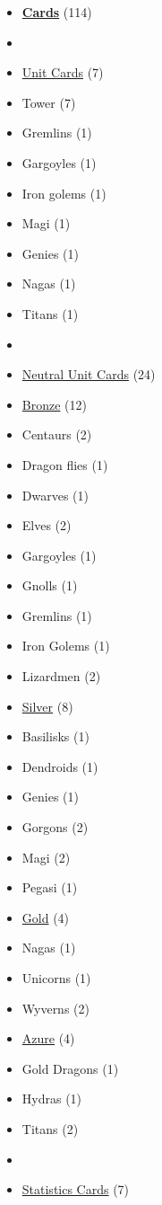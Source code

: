 \begin{multicols}{3}
\begin{itemize}[leftmargin=0pt, label={}, noitemsep, noitemsep]
  \item \textbf{\underline{Cards}} (114)
  \item
  \item \underline{Unit Cards} (7)
  \item Tower (7)
  \item Gremlins (1)
  \item Gargoyles (1)
  \item Iron golems (1)
  \item Magi (1)
  \item Genies (1)
  \item Nagas (1)
  \item Titans (1)
  \item
  \item \underline{Neutral Unit Cards} (24)
  \item \underline{Bronze} (12)
  \item Centaurs (2)
  \item Dragon flies (1)
  \item Dwarves (1)
  \item Elves (2)
  \item Gargoyles (1)
  \item Gnolls (1)
  \item Gremlins (1)
  \item Iron Golems (1)
  \item Lizardmen (2)
  \item \underline{Silver} (8)
  \item Basilisks (1)
  \item Dendroids (1)
  \item Genies (1)
  \item Gorgons (2)
  \item Magi (2)
  \item Pegasi (1)
  \item \underline{Gold} (4)
  \item Nagas (1)
  \item Unicorns (1)
  \item Wyverns (2)
  \item \underline{Azure} (4)
  \item Gold Dragons (1)
  \item Hydras (1)
  \item Titans (2)
  \item
  \item \underline{Statistics Cards} (7)

\end{itemize}
\end{multicols}
